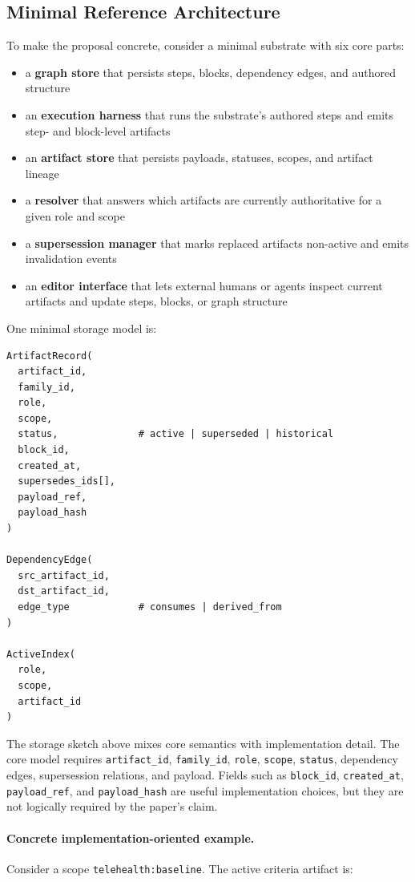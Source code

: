 \documentclass{article}
\begin{document}
\subsection{Minimal Reference Architecture}

To make the proposal concrete, consider a minimal substrate with six core parts:
\begin{itemize}
\item a \textbf{graph store} that persists steps, blocks, dependency edges, and authored structure
\item an \textbf{execution harness} that runs the substrate's authored steps and emits step- and block-level artifacts
\item an \textbf{artifact store} that persists payloads, statuses, scopes, and artifact lineage
\item a \textbf{resolver} that answers which artifacts are currently authoritative for a given role and scope
\item a \textbf{supersession manager} that marks replaced artifacts non-active and emits invalidation events
\item an \textbf{editor interface} that lets external humans or agents inspect current artifacts and update steps, blocks, or graph structure
\end{itemize}

One minimal storage model is:

\begin{verbatim}
ArtifactRecord(
  artifact_id,
  family_id,
  role,
  scope,
  status,              # active | superseded | historical
  block_id,
  created_at,
  supersedes_ids[],
  payload_ref,
  payload_hash
)

DependencyEdge(
  src_artifact_id,
  dst_artifact_id,
  edge_type            # consumes | derived_from
)

ActiveIndex(
  role,
  scope,
  artifact_id
)
\end{verbatim}

The storage sketch above mixes core semantics with implementation detail. The core model requires \texttt{artifact\_id}, \texttt{family\_id}, \texttt{role}, \texttt{scope}, \texttt{status}, dependency edges, supersession relations, and payload. Fields such as \texttt{block\_id}, \texttt{created\_at}, \texttt{payload\_ref}, and \texttt{payload\_hash} are useful implementation choices, but they are not logically required by the paper's claim.

\paragraph{Concrete implementation-oriented example.} Consider a scope \texttt{telehealth:baseline}. The active criteria artifact is:
\end{document}
